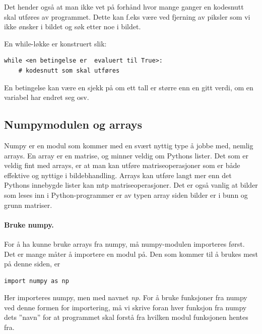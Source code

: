 \documentclass[%
oneside,                 %
final,                   %
10pt,norsk]{article}
\begin{document}
\vspace{3mm}


Det hender også at man ikke vet på forhånd hvor mange ganger en kodesnutt skal utføres av programmet. Dette kan f.eks være ved fjerning av piksler som vi ikke ønsker i bildet og søk etter noe i bildet.

En while-løkke er konstruert slik:
\begin{verbatim}
while <en betingelse er  evaluert til True>:
    # kodesnutt som skal utføres
\end{verbatim}

En betingelse kan være en sjekk på om ett tall er større enn en gitt verdi, om en variabel har endret seg osv.

\subsection{Numpymodulen og arrays}

Numpy er en modul som kommer med en svært nyttig type å jobbe med, nemlig arrays.
En array er en matrise, og minner veldig om Pythons lister. Det som er veldig fint med arrays, er at man kan utføre
matriseoperasjoner som er både effektive og nyttige i bildebhandling. Arrays kan utføre langt mer enn det Pythons innebygde lister kan mtp matriseoperasjoner.
Det er også vanlig at bilder som leses inn i Python-programmer
er av typen array siden bilder er i bunn og grunn matriser.

\paragraph{Bruke numpy.}
For å ha kunne bruke arrays fra numpy, må numpy-modulen importeres først.
Det er mange måter å importere en modul på.
Den som kommer til å brukes mest på denne siden, er
\begin{verbatim}
import numpy as np
\end{verbatim}
Her importeres numpy, men med navnet \emph{np}. For å bruke funksjoner fra numpy ved denne formen for importering, må vi
skrive foran hver funksjon fra numpy dets ''navn'' for at programmet skal forstå fra hvilken modul funksjonen hentes fra.
\end{document}

